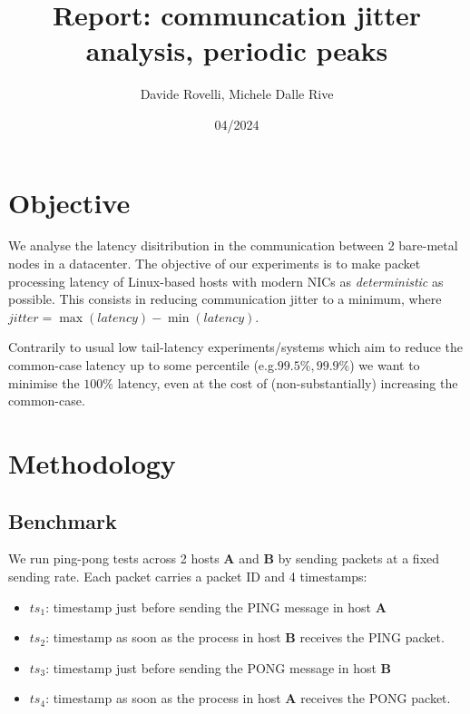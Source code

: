 \documentclass{article}
\begin{document}
\date{04/2024}

\title{\Large \bf Report: communcation jitter analysis, periodic peaks}

\author{Davide Rovelli, Michele Dalle Rive}
\maketitle

\section{Objective}
We analyse the latency disitribution in the communication between 2 bare-metal 
nodes in a datacenter. The objective of our experiments is to make packet 
processing latency of Linux-based hosts with modern NICs as \textit{deterministic}
as possible. This consists in reducing communication jitter to a minimum, where
$jitter = \max(latency) - \min(latency)$.

Contrarily to usual low tail-latency experiments/systems which aim to reduce the
common-case latency up to some percentile (e.g.$99.5\%, 99.9\%$) we want to minimise 
the $100\%$ latency, even at the cost of (non-substantially) increasing the 
common-case. 

\section{Methodology}

\subsection{Benchmark}
\label{sec:benchmark}
We run ping-pong tests across 2 hosts \textbf{A} and \textbf{B} by sending packets
at a fixed sending rate. Each packet carries a packet ID and 4 timestamps:

\begin{itemize}
  \itemsep=-0.8mm
  \item $ts_1$: timestamp just before sending the PING message in host \textbf{A}
  \item $ts_2$: timestamp as soon as the process in host \textbf{B} receives the
  PING packet.
  \item $ts_3$: timestamp just before sending the PONG message in host \textbf{B}
  \item $ts_4$: timestamp as soon as the process in host \textbf{A} receives the
  PONG packet.
\end{itemize}
\end{document}
